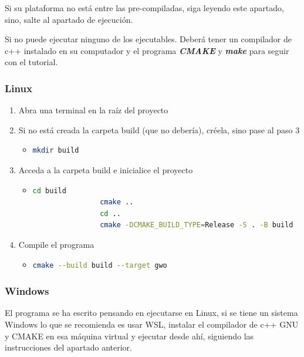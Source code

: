 \documentclass[a4paper]{report}
\begin{document}
Si su plataforma no está entre las pre-compiladas, siga leyendo este apartado, sino, salte al apartado de ejecución.

Si no puede ejecutar ninguno de los ejecutables. Deberá tener un compilador de c++ instalado en su computador y el programa \textbf{\textit{CMAKE}} y \textbf{\textit{make}}  para seguir con el tutorial.


\subsubsection*{Linux}

\begin{enumerate}
    \item Abra una terminal en la raíz del proyecto
    \item Si no está creada la carpeta build (que no debería), créela, sino pase al paso 3
          \begin{itemize}
              \item \begin{lstlisting}[language=bash]
				mkdir build
            \end{lstlisting}
          \end{itemize}
    \item Acceda a la carpeta build e inicialice el proyecto
          \begin{itemize}
              \item \begin{lstlisting}[language=bash]
				cd build
				cmake ..
				cd ..
				cmake -DCMAKE_BUILD_TYPE=Release -S . -B build
            \end{lstlisting}
          \end{itemize}
    \item Compile el programa
          \begin{itemize}
              \item \begin{lstlisting}[language=bash]
				cmake --build build --target gwo
            \end{lstlisting}
          \end{itemize}
\end{enumerate}

\subsubsection{Windows}

El programa se ha escrito pensando en ejecutarse en Linux, si se tiene un sistema Windows lo que se recomienda es usar WSL, instalar el compilador de c++ GNU y CMAKE en esa máquina virtual y ejecutar desde ahí, siguiendo las instrucciones del apartado anterior.
\end{document}
